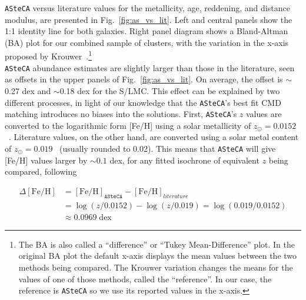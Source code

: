 \documentclass{aa}
\begin{document}
\texttt{ASteCA} versus literature values for the metallicity, age, reddening,
and distance modulus, are presented in Fig.~\ref{fig:as_vs_lit}. Left and
central panels show the 1:1 identity line for both galaxies.
%
Right panel diagram shows a Bland-Altman (BA) plot for our combined sample
of clusters, with the variation in the x-axis proposed by
Krouwer~\citep{Bland_1986,Krouwer_2008}.\footnote{The BA is also called a
``difference'' or ``Tukey Mean-Difference'' plot. In the original BA plot the
default x-axis displays the mean values between the two methods being compared.
The Krouwer variation changes the means for the values of one of those methods,
called the ``reference''. In our case, the reference is \texttt{ASteCA}
so we use its reported values in the x-axis.}\\
%

\texttt{ASteCA} abundance estimates are slightly larger than those in
the literature, seen as offsets in the upper panels of Fig.~\ref{fig:as_vs_lit}.
On average, the offset is $\sim$0.27 dex and $\sim$0.18 dex for the S/LMC.\@
%
This effect can be explained by two different processes, in light of our
knowledge that the \texttt{ASteCA}'s best fit CMD matching introduces no
biases into the solutions.
%
First, \texttt{ASteCA}'s $z$ values are converted to the logarithmic
form [Fe/H] using a solar metallicity of
$z_{\odot}{=}0.0152$~\citep{Bressan_2012}.
Literature values, on the other hand, are converted using a solar
metal content of $z_{\odot}{=}0.019$~\citep{Marigo_2008} (usually
rounded to 0.02). This means that \texttt{ASteCA} will give [Fe/H] values
larger by ${\sim}0.1$ dex, for any fitted isochrone of equivalent $z$ being
compared, following

\begin{equation}
\begin{split}
\Delta\mathrm{[Fe/H]} & = \mathrm{[Fe/H]}_{\mathtt{ASteCA}} -
\mathrm{[Fe/H]}_{literature} \\
& = \log(z/0.0152) - \log(z/0.019) = \log(0.019/0.0152) \\
& \approx 0.0969 \;\mathrm{dex}
\end{split}
\label{eq:delta_feh}
\end{equation}
\end{document}
